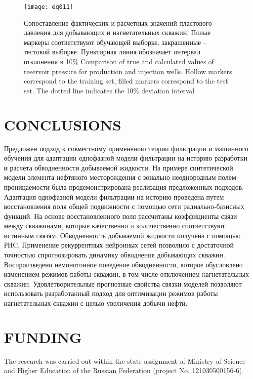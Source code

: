 \documentclass{article}
\begin{document}
\begin{figure}
	\centering
	\texttt{[image: eq011]}
	\caption{Сопоставление фактических и расчетных значений пластового давления для добывающих и нагнетательных скважин. Полые маркеры соответствуют обучающей выборке, закрашенные – тестовой выборке. Пунктирная линия обозначает интервал отклонения в 10\% Comparison of true and calculated values of reservoir pressure for production and injection wells. Hollow markers correspond to the training set, filled markers correspond to the test set. The dotted line indicates the 10\% deviation interval}
	\label{fig:eq011}
\end{figure}

\section{CONCLUSIONS}

Предложен подход к совместному применению теории фильтрации и машинного обучения для адаптации однофазной модели фильтрации на историю разработки и расчета обводненности добываемой жидкости. На примере синтетической модели элемента нефтяного месторождения с зонально неоднородным полем проницаемости была продемонстрирована реализация предложенных подходов.
Адаптация однофазной модели фильтрации на историю проведена путем восстановления поля общей подвижности с помощью сети радиально-базисных функций. На основе восстановленного поля рассчитаны коэффициенты связи между скважинами, которые качественно и количественно соответствуют истинным связям.
Обводненность добываемой жидкости получена с помощью РНC. Применение рекуррентных нейронных сетей позволило с достаточной точностью спрогнозировать динамику обводнения добывающих скважин. Воспроизведено немонотонное поведение обводненности, которое обусловлено изменением режимов работы скважин, в том числе отключением нагнетательных скважин.
Удовлетворительные прогнозные свойства связки моделей позволяют использовать разработанный подход для оптимизации режимов работы нагнетательных скважин с целью увеличения добычи нефти.

\section{FUNDING}
The research was carried out within the state assignment of Ministry of Science and Higher Education of the Russian Federation (project No. 121030500156-6).
\end{document}
